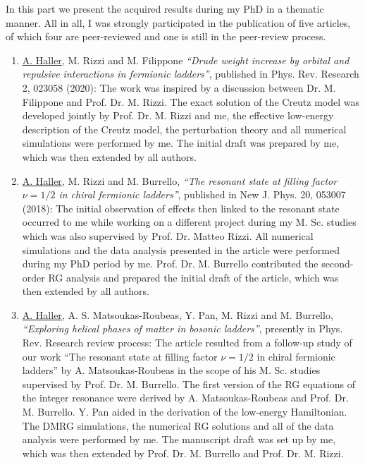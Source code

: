 
In this part we present the acquired results during my PhD in a thematic manner.
All in all, I was strongly participated in the publication of five articles, of which four are peer-reviewed and one is still in the peer-review process.

\begin{enumerate}
    \item{\underline{A. Haller}, M. Rizzi and M. Filippone {\it ``Drude weight increase by orbital and repulsive interactions in fermionic ladders''}, published in Phys. Rev. Research 2, 023058 (2020):
    The work was inspired by a discussion between Dr. M. Filippone and Prof. Dr. M. Rizzi. The exact solution of the Creutz model was developed jointly by Prof. Dr. M. Rizzi and me, the effective low-energy description of the Creutz model, the perturbation theory and all numerical simulations were performed by me. The initial draft was prepared by me, which was then extended by all authors.}
    \item{\underline{A. Haller}, M. Rizzi and M. Burrello, {\it ``The resonant state at filling factor $\nu=1/2$ in chiral fermionic ladders''}, published in New J. Phys. 20, 053007 (2018): The initial observation of effects then linked to the resonant state occurred to me while working on a different project during my M. Sc. studies which was also supervised by Prof. Dr. Matteo Rizzi. All numerical simulations and the data analysis presented in the article were performed during my PhD period by me. Prof. Dr. M. Burrello contributed the second-order RG analysis and prepared the initial draft of the article, which was then extended by all authors.}
    \item{\underline{A. Haller}, A. S. Matsoukas-Roubeas, Y. Pan, M. Rizzi and M. Burrello, {\it ``Exploring helical phases of matter in bosonic ladders''}, presently in Phys. Rev. Research review process:
    The article resulted from a follow-up study of our work ``The resonant state at filling factor $\nu=1/2$ in chiral fermionic ladders'' by A. Matsoukas-Roubeas in the scope of his M. Sc. studies supervised by Prof. Dr. M. Burrello. The first version of the RG equations of the integer resonance were derived by A. Matsoukas-Roubeas and Prof. Dr. M. Burrello. Y. Pan aided in the derivation of the low-energy Hamiltonian. The DMRG simulations, the numerical RG solutions and all of the data analysis were performed by me. The manuscript draft was set up by me, which was then extended by Prof. Dr. M. Burrello and Prof. Dr. M. Rizzi.}

\end{enumerate}
